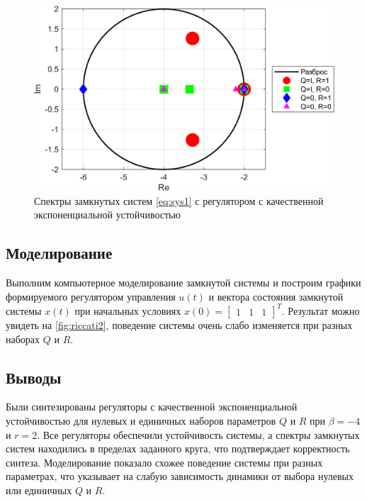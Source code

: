 \begin{figure}[H]
    \centering
    \includegraphics[width=\linewidth]{figs/task3.png}
    \caption{Спектры замкнутых систем \eqref{eq:sys1} с регулятором с 
    качественной экспоненциальной устойчивостью}
    \label{fig:riccati1}
\end{figure}


\subsection{Моделирование}

Выполним компьютерное моделирование замкнутой системы и построим
графики формируемого регулятором управления $u(t)$ и вектора состояния
замкнутой системы $x(t)$ при начальных условиях $x(0) =\begin{bmatrix}
    1&1&1
\end{bmatrix}^T$. Результат можно увидеть на \autoref{fig:riccati2},
поведение системы очень слабо изменяется при разных наборах
$Q$ и $R$.


\subsection{Выводы}

Были синтезированы регуляторы с качественной экспоненциальной устойчивостью для 
нулевых и единичных наборов параметров $Q$ и $R$ при $\beta=-4$ и $r=2$. Все 
регуляторы обеспечили устойчивость 
системы, а спектры замкнутых систем находились в пределах заданного круга, что 
подтверждает корректность синтеза. Моделирование показало схожее поведение системы 
при разных параметрах, что указывает на слабую зависимость динамики от выбора 
нулевых или единичных $Q$ и $R$.


